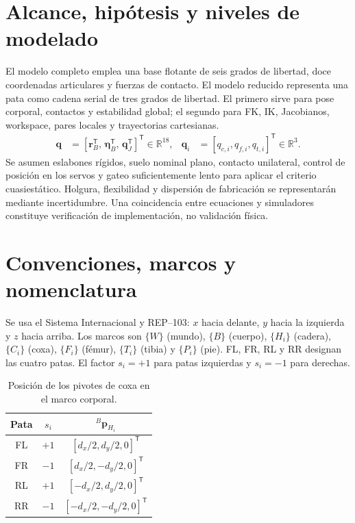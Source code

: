 \documentclass[11pt,letterpaper]{article}
\newcommand{\vect}[1]{\bm{#1}}
\newcommand{\R}{\mathbb{R}}
\newcommand{\trans}{^{\mathsf T}}
\begin{document}
\section{Alcance, hipótesis y niveles de modelado}
El modelo completo emplea una base flotante de seis grados de libertad, doce
coordenadas articulares y fuerzas de contacto. El modelo reducido representa
una pata como cadena serial de tres grados de libertad. El primero sirve para
pose corporal, contactos y estabilidad global; el segundo para FK, IK,
Jacobianos, workspace, pares locales y trayectorias cartesianas.
\begin{align}
 \vect q &= [\vect r_B\trans,\,\vect\eta_B\trans,\,\vect q_J\trans]\trans
 \in\R^{18}, &
 \vect q_i &= [q_{c,i},q_{f,i},q_{t,i}]\trans\in\R^3. \label{eq:qlevels}
\end{align}
Se asumen eslabones rígidos, suelo nominal plano, contacto unilateral, control
de posición en los servos y gateo suficientemente lento para aplicar el
criterio cuasiestático. Holgura, flexibilidad y dispersión de fabricación se
representarán mediante incertidumbre. Una coincidencia entre ecuaciones y
simuladores constituye verificación de implementación, no validación física.

\section{Convenciones, marcos y nomenclatura}
Se usa el Sistema Internacional y REP--103: $x$ hacia delante, $y$ hacia la
izquierda y $z$ hacia arriba. Los marcos son $\{W\}$ (mundo), $\{B\}$ (cuerpo),
$\{H_i\}$ (cadera), $\{C_i\}$ (coxa), $\{F_i\}$ (fémur), $\{T_i\}$ (tibia) y
$\{P_i\}$ (pie). FL, FR, RL y RR designan las cuatro patas. El factor
$s_i=+1$ para patas izquierdas y $s_i=-1$ para derechas.
\begin{table}[ht]
\centering\caption{Posición de los pivotes de coxa en el marco corporal.}
\begin{tabular}{ccc}\toprule
Pata & $s_i$ & ${}^B\vect p_{H_i}$ \\ \midrule
FL & $+1$ & $[d_x/2,d_y/2,0]\trans$ \\
FR & $-1$ & $[d_x/2,-d_y/2,0]\trans$ \\
RL & $+1$ & $[-d_x/2,d_y/2,0]\trans$ \\
RR & $-1$ & $[-d_x/2,-d_y/2,0]\trans$ \\ \bottomrule
\end{tabular}\end{table}
\end{document}
